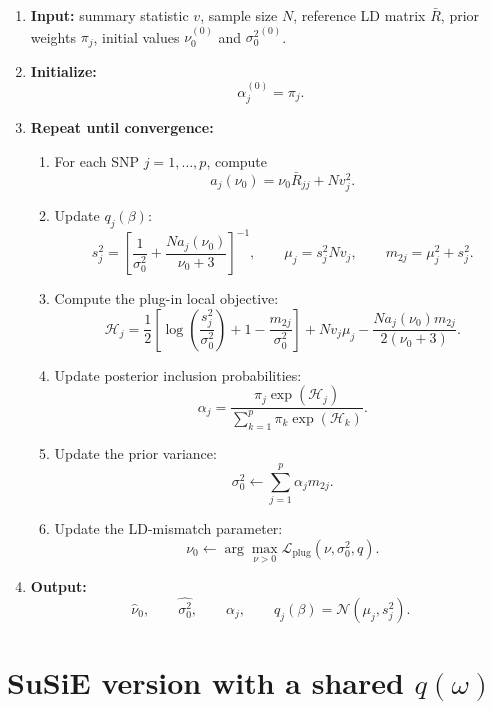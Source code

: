 \documentclass[11pt]{article}
\newcommand{\Rbar}{\bar R}
\newcommand{\nuo}{\nu_0}
\newcommand{\sigb}{\sigma_0^2}
\newcommand{\Normal}{\mathcal N}
\begin{document}
\begin{enumerate}[leftmargin=2em]

\item \textbf{Input:}
summary statistic \(v\), sample size \(N\), reference LD matrix \(\Rbar\), prior weights \(\pi_j\), initial values \(\nuo^{(0)}\) and \({\sigb}^{(0)}\).

\item \textbf{Initialize:}
\[
\alpha_j^{(0)}=\pi_j.
\]

\item \textbf{Repeat until convergence:}

\begin{enumerate}[leftmargin=2em]

\item For each SNP \(j=1,\dots,p\), compute
\[
a_j(\nuo)=\nuo\Rbar_{jj}+Nv_j^2.
\]

\item Update \(q_j(\beta)\):
\[
s_j^2
=
\left[
\frac{1}{\sigb}
+
\frac{N a_j(\nuo)}{\nuo+3}
\right]^{-1},
\qquad
\mu_j=s_j^2Nv_j,
\qquad
m_{2j}=\mu_j^2+s_j^2.
\]

\item Compute the plug-in local objective:
\[
\mathcal H_j
=
\frac12
\left[
\log\left(\frac{s_j^2}{\sigb}\right)
+
1
-
\frac{m_{2j}}{\sigb}
\right]
+
Nv_j\mu_j
-
\frac{N a_j(\nuo)m_{2j}}{2(\nuo+3)}.
\]

\item Update posterior inclusion probabilities:
\[
\alpha_j
=
\frac{
\pi_j\exp(\mathcal H_j)
}{
\sum_{k=1}^p
\pi_k\exp(\mathcal H_k)
}.
\]

\item Update the prior variance:
\[
\sigb
\leftarrow
\sum_{j=1}^p
\alpha_j m_{2j}.
\]

\item Update the LD-mismatch parameter:
\[
\nuo
\leftarrow
\arg\max_{\nu>0}
\mathcal L_{\mathrm{plug}}(\nu,\sigb,q).
\]

\end{enumerate}

\item \textbf{Output:}
\[
\widehat\nuo,
\qquad
\widehat{\sigb},
\qquad
\alpha_j,
\qquad
q_j(\beta)=\Normal(\mu_j,s_j^2).
\]

\end{enumerate}

\section{SuSiE version with a shared \(q(\omega)\)}
\end{document}
